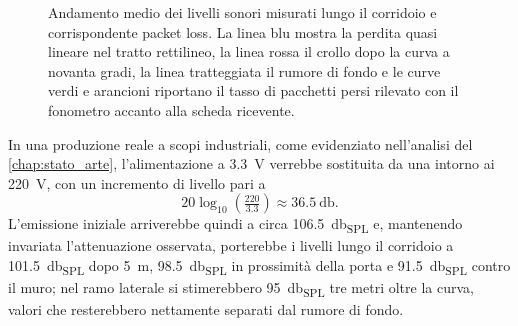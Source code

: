 \begin{figure}[H]
            \caption{Andamento medio dei livelli sonori misurati lungo il corridoio e corrispondente packet loss. 
            La linea blu mostra la perdita quasi lineare nel tratto rettilineo, la linea rossa il crollo dopo la curva a novanta gradi,
             la linea tratteggiata il rumore di fondo e le curve verdi e arancioni riportano il tasso di pacchetti persi rilevato con il fonometro 
             accanto alla scheda ricevente.}
            \label{fig:profilo_db}
        \end{figure}
        
          In una produzione reale a scopi industriali, come evidenziato nell'analisi
          del \autoref{chap:stato_arte}, l'alimentazione a \SI{3.3}{\volt} verrebbe sostituita da una intorno ai \SI{220}{\volt}, 
          con un incremento di livello pari a
          \begin{equation}
          20\log_{10}\!\left(\tfrac{220}{3.3}\right) \approx \SI{36.5}{\decibel}.
          \end{equation}
          L'emissione iniziale arriverebbe quindi a 
          circa \SI{106.5}{\decibel_{SPL}} e, mantenendo invariata l'attenuazione osservata, porterebbe i livelli lungo il corridoio a \SI{101.5}{\decibel_{SPL}} 
          dopo \SI{5}{\meter}, \SI{98.5}{\decibel_{SPL}} in prossimità della porta e \SI{91.5}{\decibel_{SPL}} contro il muro; nel ramo laterale si stimerebbero 
          \SI{95}{\decibel_{SPL}} tre metri oltre la curva, valori che resterebbero nettamente separati dal rumore di fondo.


        

